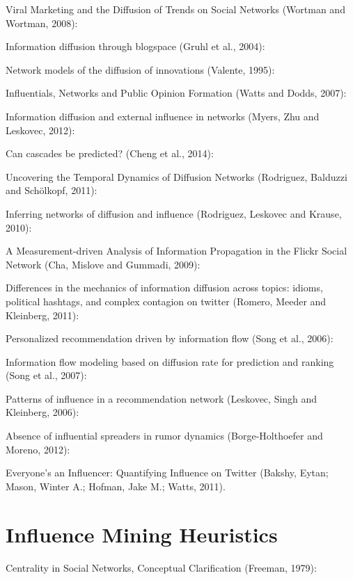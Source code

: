 Viral Marketing and the Diffusion of Trends on Social Networks (Wortman and Wortman, 2008):

Information diffusion through blogspace (Gruhl et al., 2004):

Network models of the diffusion of innovations (Valente, 1995):

Influentials, Networks and Public Opinion Formation (Watts and Dodds, 2007):

Information diffusion and external influence in networks (Myers, Zhu and Leskovec, 2012):

Can cascades be predicted? (Cheng et al., 2014):

Uncovering the Temporal Dynamics of Diffusion Networks (Rodriguez, Balduzzi and Schölkopf, 2011):

Inferring networks of diffusion and influence (Rodriguez, Leskovec and Krause, 2010):

A Measurement-driven Analysis of Information Propagation in the Flickr Social Network (Cha, Mislove and Gummadi, 2009):

Differences in the mechanics of information diffusion across topics: idioms, political hashtags, and complex contagion on twitter (Romero, Meeder and Kleinberg, 2011):

Personalized recommendation driven by information flow (Song et al., 2006):

Information flow modeling based on diffusion rate for prediction and ranking (Song et al., 2007):

Patterns of influence in a recommendation network (Leskovec, Singh and Kleinberg, 2006):

Absence of influential spreaders in rumor dynamics (Borge-Holthoefer and Moreno, 2012):

Everyone’s an Influencer: Quantifying Influence on Twitter (Bakshy, Eytan; Mason, Winter A.; Hofman, Jake M.; Watts, 2011).


\section*{Influence Mining Heuristics}

Centrality in Social Networks, Conceptual Clarification (Freeman, 1979):

